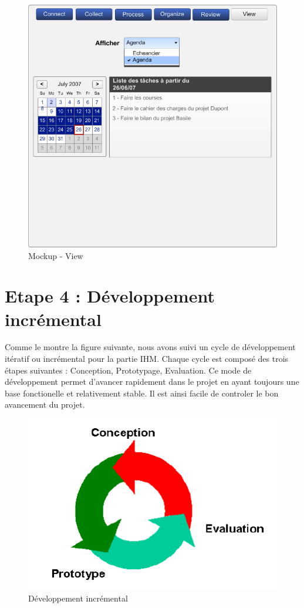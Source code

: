 \begin{figure}[H]
  \begin{center}
  \includegraphics[scale=0.5]{diagrams/view.png}
  \caption{Mockup - View}
  \end{center}
\end{figure}


\chapter{Etape 4 : Développement incrémental}

Comme le montre la figure suivante, nous avons suivi un cycle de développement itératif ou incrémental pour la partie IHM. Chaque cycle est composé des trois étapes suivantes : Conception, Prototypage, Evaluation. Ce mode de développement permet d'avancer rapidement dans le projet en ayant toujours une base fonctionelle et relativement stable. Il est ainsi facile de controler le bon avancement du projet.



\begin{figure}[H]
  \begin{center}
  \includegraphics[scale=1]{diagrams/increm.png}
  \caption{Développement incrémental}
  \end{center}
\end{figure}

